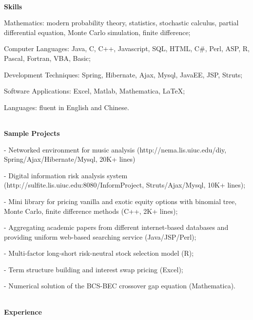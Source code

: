 \documentclass[9.5pt]{article}
\begin{document}
\hrulefill\\
\vspace{0.12in}
{\large \textbf{Skills}}

\begin{description*}
\item[Mathematics:]
modern probability theory, statistics, stochastic calculus, partial differential equation, Monte Carlo simulation,  finite difference;  
\item[Computer Languages:]
 Java, C, C++,  Javascript, SQL, HTML, C\#, Perl,   ASP,  R, Pascal,  Fortran, VBA, Basic;
 \item[Development Techniques:]
Spring, Hibernate, Ajax, Mysql, JavaEE,  JSP, Struts;
\item[Software Applications:]
Excel,  Matlab, Mathematica, \LaTeX;
\item[Languages:]
fluent in English and Chinese.

\end{description*}
\hrulefill\\
\vspace{0.12in}
{\large \textbf{Sample Projects}}

\begin{itemize*}
\item[-] Networked environment for music analysis ({http://nema.lis.uiuc.edu/diy}, Spring/Ajax/Hibernate/Mysql, 20K+ lines)
\item[-] Digital information risk analysis system ({http://sulfite.lis.uiuc.edu:8080/InformProject}, Struts/Ajax/Mysql, 10K+ lines);
\item[-] Mini library for pricing vanilla and exotic equity options with binomial tree, Monte Carlo, finite difference methods (C++, 2K+ lines);
\item[-] Aggregating academic papers from different internet-based databases and providing uniform web-based searching service (Java/JSP/Perl);
\item[-] Multi-factor long-short risk-neutral stock selection model (R);
\item[-] Term structure building and interest swap pricing (Excel); 
\item[-] Numerical solution of the BCS-BEC crossover gap equation (Mathematica).
\end{itemize*}
\hrulefill\\
\vspace{0.12in}
{\large \textbf{Experience}}
\end{document}
